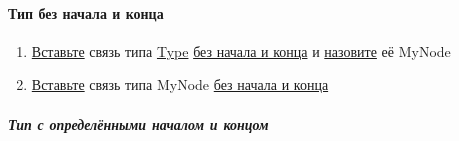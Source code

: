\paragraph{Тип без начала и конца}
\begin{enumerate}
      \item \hyperlink{DeepCase.InsertLink.Description}{Вставьте} связь типа
            \hyperlink{Core.Type.Description}{Type}
            \hyperlink{FAQ.HowToInsertLinkWithoutFromAndTo}{без
                  начала и конца} и \hyperlink{FAQ.HowToSetName}{назовите} её
            MyNode
      \item \hyperlink{DeepCase.InsertLink.Description}{Вставьте} связь типа
            MyNode
            \hyperlink{FAQ.HowToInsertLinkWithoutFromAndTo}{без начала и конца}
\end{enumerate}
\subparagraph{Тип с определёнными началом и концом}
